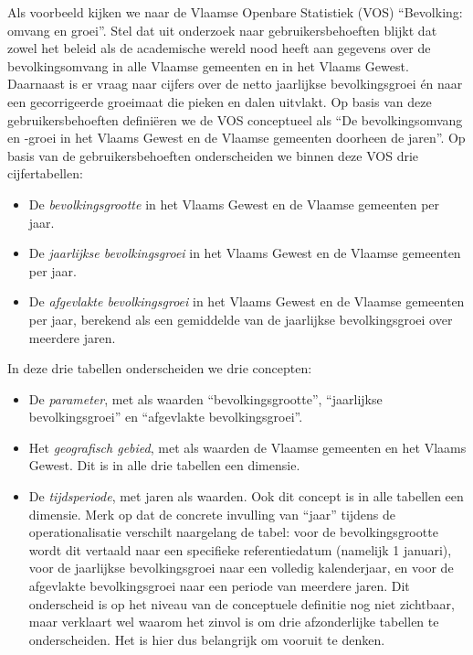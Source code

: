 \documentclass[\mainfiledir/00_handleiding_statistiekproductie.tex]{subfiles}
\begin{document}
Als voorbeeld kijken we naar de Vlaamse Openbare Statistiek (VOS) ``Bevolking: omvang en groei''. Stel dat uit onderzoek naar gebruikersbehoeften blijkt dat zowel het beleid als de academische wereld nood heeft aan gegevens over de bevolkingsomvang in alle Vlaamse gemeenten en in het Vlaams Gewest. Daarnaast is er vraag naar cijfers over de netto jaarlijkse bevolkingsgroei én naar een gecorrigeerde groeimaat die pieken en dalen uitvlakt. Op basis van deze gebruikersbehoeften definiëren we de VOS conceptueel als ``De bevolkingsomvang en -groei in het Vlaams Gewest en de Vlaamse gemeenten doorheen de jaren''. Op basis van de gebruikersbehoeften onderscheiden we binnen deze VOS drie cijfertabellen:
\begin{itemize}[nosep]
\item De \emph{bevolkingsgrootte} in het Vlaams Gewest en de Vlaamse gemeenten per jaar.
\item De \emph{jaarlijkse bevolkingsgroei} in het Vlaams Gewest en de Vlaamse gemeenten per jaar.
\item De \emph{afgevlakte bevolkingsgroei} in het Vlaams Gewest en de Vlaamse gemeenten per jaar, berekend als een gemiddelde van de jaarlijkse bevolkingsgroei over meerdere jaren.
\end{itemize}
In deze drie tabellen onderscheiden we drie concepten:
\begin{itemize}[nosep]
\item De \emph{parameter}, met als waarden ``bevolkingsgrootte'', ``jaarlijkse bevolkingsgroei'' en ``afgevlakte bevolkingsgroei''. 
\item Het \emph{geografisch gebied}, met als waarden de Vlaamse gemeenten en het Vlaams Gewest. Dit is in alle drie tabellen een dimensie. 
\item De \emph{tijdsperiode}, met jaren als waarden. Ook dit concept is in alle tabellen een dimensie. Merk op dat de concrete invulling van ``jaar'' tijdens de operationalisatie verschilt naargelang de tabel: voor de bevolkingsgrootte wordt dit vertaald naar een specifieke referentiedatum (namelijk 1 januari), voor de jaarlijkse bevolkingsgroei naar een volledig kalenderjaar, en voor de afgevlakte bevolkingsgroei naar een periode van meerdere jaren. Dit onderscheid is op het niveau van de conceptuele definitie nog niet zichtbaar, maar verklaart wel waarom het zinvol is om drie afzonderlijke tabellen te onderscheiden. Het is hier dus belangrijk om vooruit te denken.
\end{itemize}
\end{document}
